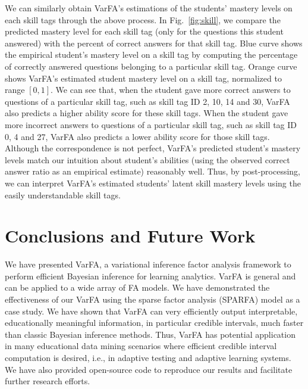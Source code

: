 \documentclass{edm_article}
\newcommand{\ml}[1]{\textcolor{orange}{\bf [LAN bandit: #1]}}
\newcommand{\jack}[1]{\textcolor{purple}{\bf [jack the ripper: #1]}}
\begin{document}
We can similarly obtain VarFA's estimations of the students' mastery levels on each skill tags through the above process. In Fig.~\ref{fig:skill}, we compare the predicted mastery level for each skill tag (only for the questions this student answered) with the percent of correct answers for that skill tag.
Blue curve shows the empirical student's mastery level on a skill tag by computing the percentage of correctly answered questions belonging to a particular skill tag. Orange curve shows VarFA's estimated student mastery level on a skill tag, normalized to range $[0,1]$. 
%
We can see that, when the student gave more correct answers to questions of a particular skill tag, such as skill tag ID 2, 10, 14 and 30, VarFA also predicts a higher ability score for these skill tags. When the student gave more incorrect answers to questions of a particular skill tag, such as skill tag ID 0, 4 and 27, VarFA also predicts a lower ability score for those skill tags. Although the correspondence is not perfect, VarFA's predicted student's mastery levels match our intuition about student's abilities (using the observed correct answer ratio as an empirical estimate) reasonably well. Thus, by post-processing, we can interpret VarFA's estimated students' latent skill mastery levels using the easily understandable skill tags. 


\section{Conclusions and Future Work}
\label{sec:conclusion}
We have presented VarFA, a variational inference factor analysis framework to perform efficient Bayesian inference for learning analytics. VarFA is general and can be applied to a wide array of FA models. We have demonstrated the effectiveness of our VarFA using the sparse factor analysis (SPARFA) model as a case study. We have shown that VarFA can very efficiently output interpretable, educationally meaningful information, in particular credible intervals, much faster than classic Bayesian inference methods. Thus, VarFA has potential application in many educational data mining scenarios where efficient credible interval computation is desired, i.e., in adaptive testing and adaptive learning systems. We have also provided open-source code to reproduce our results and facilitate further research efforts.
\end{document}
